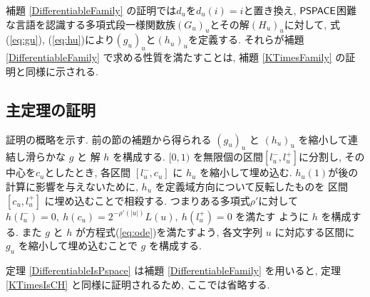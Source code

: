  補題 \ref{DifferentiableFamily} の証明では$d_u$を$d_u(i) = i$と置き換え,
 $\mathsf{PSPACE}$困難な言語を認識する多項式段一様関数族$(G_u)_u$とその解$(H_u)_u$に対して,
 式(\ref{eq:gu}), (\ref{eq:hu})により$(g_u)_u$と$(h_u)_u$を定義する.
 それらが補題 \ref{DifferentiableFamily} で求める性質を満たすことは,
 補題 \ref{KTimesFamily} の証明と同様に示される.


\subsection{主定理の証明}
\label{subsection: proof of theorems}

 証明の概略を示す.
 前の節の補題から得られる $(g_u)_u$ と $(h_u)_u$ を縮小して連結し滑らかな $g$ と
 解 $h$ を構成する.
 $[0,1)$ を無限個の区間$[l^-_u, l^+_u]$に分割し, 
 その中心を$c_u$としたとき, 各区間 $[l^-_u, c_u]$ に $h_u$ を縮小して埋め込む. 
 $h_u(1)$が後の計算に影響を与えないために,
 $h_u$ を定義域方向について反転したものを
 区間 $[c_u, l^+_u]$ に埋め込むことで相殺する.
 つまりある多項式$\rho'$に対して
 $h(l^-_u) = 0,\ h(c_u) = 2^{-\rho'(|u|)} L(u),\ h(l^+_u) = 0$ を満たす
 ように $h$ を構成する.
 また $g$ と $h$ が方程式(\ref{eq:ode})を満たすよう,
 各文字列 $u$ に対応する区間に $g_u$ を縮小して埋め込むことで $g$ を構成する.

 定理 \ref{DifferentiableIsPspace} は補題 \ref{DifferentiableFamily} を用いると,
 定理 \ref{KTimesIsCH} と同様に証明されるため, ここでは省略する.

